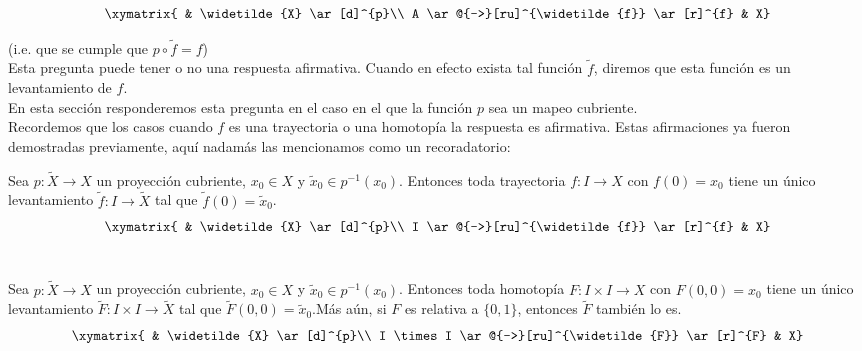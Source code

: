 $$ \xymatrix{    & \widetilde{X} \ar[d]^{p}\\
              A \ar@{-->}[ru]^{\widetilde{f}} \ar[r]^{f} & X} $$



(i.e. que se cumple que $p \circ \widetilde{f}= f$)\\
Esta pregunta puede tener o no una respuesta afirmativa. Cuando en efecto exista tal funci\'on $\widetilde{f}$, diremos que esta funci\'on es un levantamiento de $f$.\\
En esta secci\'on responderemos esta pregunta en el caso en el que la funci\'on $p$ sea un mapeo cubriente.\\
Recordemos que los casos cuando $f$ es una trayectoria o una homotop\'ia la respuesta es afirmativa. Estas afirmaciones ya fueron demostradas previamente, aqu\'i nadam\'as las mencionamos como un recoradatorio:\\ 

\begin{theorem}\label{LevanTray}

Sea $p:\widetilde{X} \rightarrow X$ un proyecci\'on cubriente, $x_0 \in X$ y $\widetilde x_0 \in p^{-1}(x_0)$. Entonces toda trayectoria $f:I \rightarrow X$ con $f(0)=x_0$ tiene un \'unico levantamiento $\widetilde{f}: I \rightarrow \widetilde{X}$ tal que $\widetilde{f}(0)= \widetilde x_0$.\\

$$ \xymatrix{    & \widetilde{X} \ar[d]^{p}\\
              I \ar@{-->}[ru]^{\widetilde{f}} \ar[r]^{f} & X} $$\\

\end{theorem}
 
\begin{theorem}\label{LevanHomo}

Sea $p:\widetilde{X} \rightarrow X$ un proyecci\'on cubriente, $x_0 \in X$ y $\widetilde x_0 \in p^{-1}(x_0)$. Entonces toda homotop\'ia $F:I \times I \rightarrow X$ con $F(0,0)=x_0$ tiene un \'unico levantamiento $\widetilde{F}: I \times I \rightarrow \widetilde{X}$ tal que $\widetilde{F}(0,0)= \widetilde x_0$.M\'as a\'un, si $F$ es relativa a $\lbrace 0,1 \rbrace$, entonces $\widetilde{F}$ tambi\'en lo es.\\

$$ \xymatrix{    & \widetilde{X} \ar[d]^{p}\\
              I \times I \ar@{-->}[ru]^{\widetilde{F}} \ar[r]^{F} & X} $$\\

\end{theorem}

